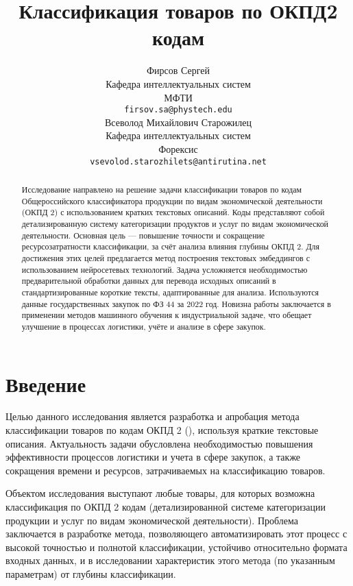 \documentclass{article}
\title{Классификация товаров по ОКПД2 кодам}
\author{ Фирсов Сергей \\
        Кафедра интеллектуальных систем\\
	МФТИ\\
	\texttt{firsov.sa@phystech.edu} \\
	\And
	Всеволод Михайлович Старожилец \\
	Кафедра интеллектуальных систем\\
	Форексис\\
	\texttt{vsevolod.starozhilets@antirutina.net} \\
}
\date{}
\begin{document}
\maketitle

\begin{abstract}
    Исследование направлено на решение задачи классификации товаров по кодам Общероссийского классификатора продукции по видам экономической деятельности (ОКПД 2) с использованием кратких текстовых описаний. Коды представляют собой детализированную систему категоризации продуктов и услуг по видам экономической деятельности. Основная цель --- повышение точности и сокращение ресурсозатратности классификации, за счёт анализа влияния глубины ОКПД 2. Для достижения этих целей предлагается метод построения текстовых эмбеддингов с использованием нейросетевых технологий. Задача усложняется необходимостью предварительной обработки данных для перевода исходных описаний в стандартизированные короткие тексты, адаптированные для анализа. Используются данные государственных закупок по ФЗ 44 за 2022 год. Новизна работы заключается в применении методов машинного обучения к индустриальной задаче, что обещает улучшение в процессах логистики, учёте и анализе в сфере закупок. 


 
\end{abstract}



\section{Введение}

Целью данного исследования является разработка и апробация метода классификации товаров по кодам ОКПД 2 (\cite{OKPD2024}), используя краткие текстовые описания. Актуальность задачи обусловлена необходимостью повышения эффективности процессов логистики и учета в сфере закупок, а также сокращения времени и ресурсов, затрачиваемых на классификацию товаров.

Объектом исследования выступают любые товары, для которых возможна классификация по ОКПД 2 кодам (детализированной системе категоризации продукции и услуг по видам экономической деятельности). Проблема заключается в разработке метода, позволяющего автоматизировать этот процесс с высокой точностью и полнотой классификации, устойчиво относительно формата входных данных, и в исследовании характеристик этого метода (по указанным параметрам) от глубины классификации.
\end{document}
